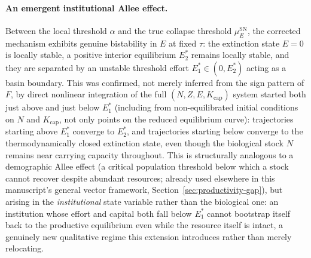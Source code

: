 \documentclass[twocolumn,10pt]{article}
\begin{document}
\paragraph{An emergent institutional Allee effect.} Between the local threshold $\alpha$ and the true collapse threshold $\mu_E^{\text{SN}}$, the corrected mechanism exhibits genuine bistability in $E$ at fixed $\tau$: the extinction state $E=0$ is locally stable, a positive interior equilibrium $E_2^*$ remains locally stable, and they are separated by an unstable threshold effort $E_1^*\in(0,E_2^*)$ acting as a basin boundary. This was confirmed, not merely inferred from the sign pattern of $F$, by direct nonlinear integration of the full $(N,Z,E,K_{\text{cap}})$ system started both just above and just below $E_1^*$ (including from non-equilibrated initial conditions on $N$ and $K_{\text{cap}}$, not only points on the reduced equilibrium curve): trajectories starting above $E_1^*$ converge to $E_2^*$, and trajectories starting below converge to the thermodynamically closed extinction state, even though the biological stock $N$ remains near carrying capacity throughout. This is structurally analogous to a demographic Allee effect (a critical population threshold below which a stock cannot recover despite abundant resources; already used elsewhere in this manuscript's general vector framework, Section~\ref{sec:productivity-gap}), but arising in the \emph{institutional} state variable rather than the biological one: an institution whose effort and capital both fall below $E_1^*$ cannot bootstrap itself back to the productive equilibrium even while the resource itself is intact, a genuinely new qualitative regime this extension introduces rather than merely relocating.
\end{document}
